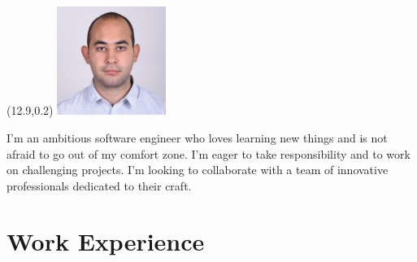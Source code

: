 \documentclass[11pt,a4paper,sans]{moderncv}        %
\begin{document}
\makecvtitle
\begin{textblock}{0}(12.9,0.2)
  \includegraphics[width=100pt]{picture}\par
\end{textblock}




\small{I’m an ambitious software engineer who loves learning new things and is not afraid to go out of my comfort zone. I’m eager to take responsibility and to work on challenging projects. I’m looking to collaborate with a team of innovative professionals dedicated to their craft.}

\section{Work Experience}

\vspace{6pt}
\end{document}
